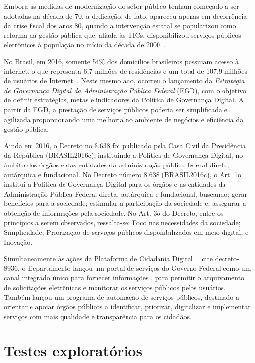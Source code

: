 Embora as medidas de modernização do setor público tenham começado a ser adotadas na década de 70, a dedicação, de fato, 
apareceu apenas em decorrência da crise fiscal dos anos 80, quando a intervenção estatal se popularizou como reforma da gestão 
pública que, aliada às TICs, disponibilizou serviços públicos eletrônicos à população no início da década de 2000~\cite{przeybilovicz2015desenvolvimento}.


No Brasil, em 2016, somente 54\% dos domicílios brasileiros possuiam acesso à internet, o que representa 6,7 milhões de residências
e um total de 107,9 milhões de usuários de Internet~\cite{CGI}. Neste mesmo ano, ocorreu o lançamento da \textit{Estratégia de Governança Digital da Administração Pública Federal} (EGD),
com o objetivo de definir estratégias, metas e indicadores da Política de Governança Digital. A partir da EGD, a prestação de serviços
públicos poderia ser simplificada e agilizada proporcionando uma melhoria no ambiente de negócios e eficiência da gestão pública.

Ainda em 2016, o Decreto no 8.638 foi publicado pela Casa Civil da Presidência da República (BRASIL2016c), instituindo a Política 
de Governança Digital, no âmbito dos órgãos e das entidades da administração pública federal direta, autárquica e fundacional. No 
Decreto número 8.638 (BRASIL2016c), o Art. 1o institui a Política de Governança Digital para os órgãos e as entidades da Administração Pública Federal direta, autárquica e
fundacional, buscando: gerar benefícios para a sociedade; estimular a participação da sociedade e; assegurar a obtenção de informações pela sociedade.
No Art. 3o do Decreto, entre os princípios a serem observados, ressalta-se: Foco nas necessidades da sociedade; Simplicidade; 
Priorização de serviços públicos disponibilizados em meio digital; e Inovação.


Simultaneamente às ações da Plataforma de Cidadania Digital~ \ cite {decreto-8936}, o Departamento lançou um portal de serviços 
do Governo Federal como um canal integrado único para fornecer informações , para permitir o arquivamento 
de solicitações eletrônicas e monitorar os serviços públicos pelos usuários. Também lançou um programa de automação de serviços 
públicos, destinado a orientar e apoiar órgãos públicos a identificar, priorizar, digitalizar e implementar
serviços com mais qualidade e transparência para os cidadãos.


\section{Testes exploratórios}

